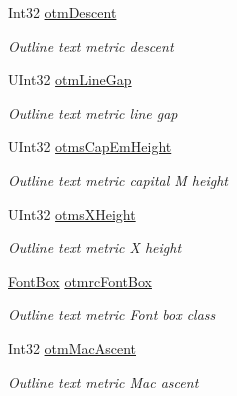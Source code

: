 \begin{DoxyCompactItemize}
Int32 \hyperlink{class_pdf_file_writer_1_1_win_outline_text_metric_af8798d1cc777a3fcb07642b655d81f12}{otm\+Descent}
\begin{DoxyCompactList}\small\item\em Outline text metric descent \end{DoxyCompactList}\item 
U\+Int32 \hyperlink{class_pdf_file_writer_1_1_win_outline_text_metric_a8a8b8cee38d6b5a25e830874e03d5d5e}{otm\+Line\+Gap}
\begin{DoxyCompactList}\small\item\em Outline text metric line gap \end{DoxyCompactList}\item 
U\+Int32 \hyperlink{class_pdf_file_writer_1_1_win_outline_text_metric_af43187380802cf34201f1adc7f4142b1}{otms\+Cap\+Em\+Height}
\begin{DoxyCompactList}\small\item\em Outline text metric capital M height \end{DoxyCompactList}\item 
U\+Int32 \hyperlink{class_pdf_file_writer_1_1_win_outline_text_metric_a52f7935164260a1b1a1cb21368e19e97}{otms\+X\+Height}
\begin{DoxyCompactList}\small\item\em Outline text metric X height \end{DoxyCompactList}\item 
\hyperlink{class_pdf_file_writer_1_1_font_box}{Font\+Box} \hyperlink{class_pdf_file_writer_1_1_win_outline_text_metric_a2b2fb259ca0f966757fccbe58f7fbb2f}{otmrc\+Font\+Box}
\begin{DoxyCompactList}\small\item\em Outline text metric Font box class \end{DoxyCompactList}\item 
Int32 \hyperlink{class_pdf_file_writer_1_1_win_outline_text_metric_a1ae7279adba389ab41264c64619d0dac}{otm\+Mac\+Ascent}
\begin{DoxyCompactList}\small\item\em Outline text metric Mac ascent \end{DoxyCompactList}\item 

\end{DoxyCompactItemize}
